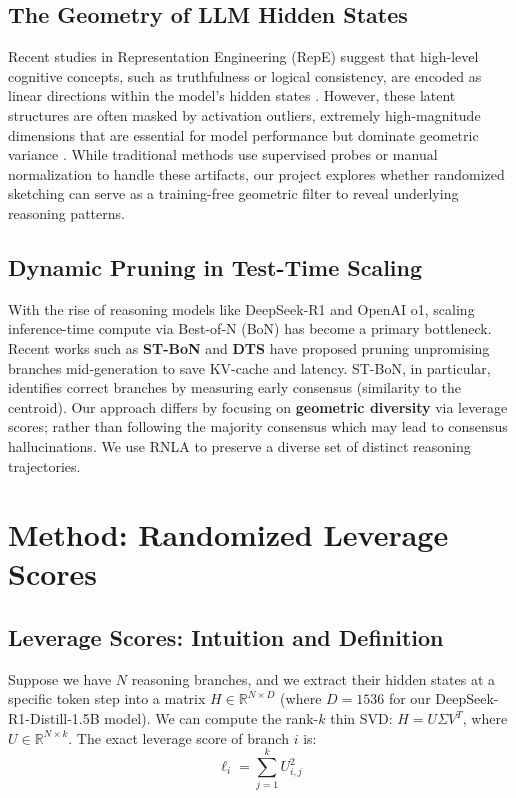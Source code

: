 \documentclass[11pt]{article}
\begin{document}
\subsection{The Geometry of LLM Hidden States}
Recent studies in Representation Engineering (RepE) suggest that high-level cognitive concepts, such as truthfulness or logical consistency, are encoded as linear directions within the model's hidden states \cite{Zou2023RepE, Marks2023Geometry}. However, these latent structures are often masked by activation outliers, extremely high-magnitude dimensions that are essential for model performance but dominate geometric variance \cite{Xiao2023SmoothQuant}. While traditional methods use supervised probes or manual normalization to handle these artifacts, our project explores whether randomized sketching can serve as a training-free geometric filter to reveal underlying reasoning patterns.

\subsection{Dynamic Pruning in Test-Time Scaling}
With the rise of reasoning models like DeepSeek-R1 and OpenAI o1, scaling inference-time compute via Best-of-N (BoN) has become a primary bottleneck. Recent works such as \textbf{ST-BoN} \cite{Wang2025STBoN} and \textbf{DTS} \cite{Xu2025DTS} have proposed pruning unpromising branches mid-generation to save KV-cache and latency. ST-BoN, in particular, identifies correct branches by measuring early consensus (similarity to the centroid). Our approach differs by focusing on \textbf{geometric diversity} via leverage scores; rather than following the majority consensus which may lead to consensus hallucinations. We use RNLA to preserve a diverse set of distinct reasoning trajectories.


\section{Method: Randomized Leverage Scores}
\label{sec:method}

\subsection{Leverage Scores: Intuition and Definition}
\label{sec:leverage-def}

Suppose we have $N$ reasoning branches, and we extract their hidden states at a specific token step into a matrix $H \in \mathbb{R}^{N \times D}$ (where $D=1536$ for our DeepSeek-R1-Distill-1.5B model). We can compute the rank-$k$ thin SVD: $H = U\Sigma V^T$, where $U \in \mathbb{R}^{N \times k}$.
The exact leverage score of branch $i$ is:
\begin{equation}
\ell_i = \sum_{j=1}^{k} U_{i,j}^2
\label{eq:leverage}
\end{equation}
\end{document}
